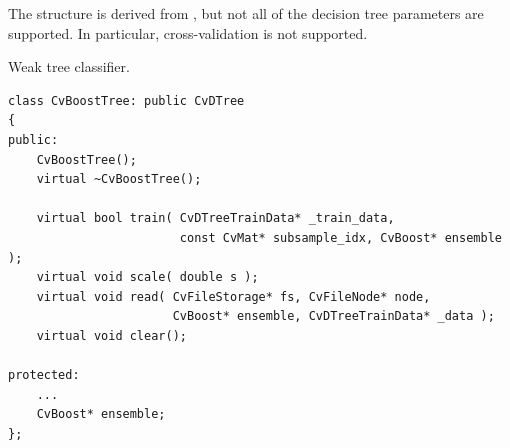 
The structure is derived from , but not all of the decision tree parameters are supported. In particular, cross-validation is not supported.


Weak tree classifier.

\begin{lstlisting}
class CvBoostTree: public CvDTree
{
public:
    CvBoostTree();
    virtual ~CvBoostTree();

    virtual bool train( CvDTreeTrainData* _train_data,
                        const CvMat* subsample_idx, CvBoost* ensemble );
    virtual void scale( double s );
    virtual void read( CvFileStorage* fs, CvFileNode* node,
                       CvBoost* ensemble, CvDTreeTrainData* _data );
    virtual void clear();

protected:
    ...
    CvBoost* ensemble;
};
\end{lstlisting}


